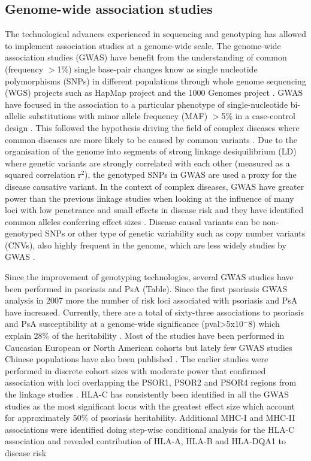\subsection{Genome-wide association studies}
The technological advances experienced in sequencing and genotyping has allowed to implement association studies at a genome-wide scale. The genome-wide association studies (GWAS) have benefit from the understanding of common (frequency ${>}$1\%) single base-pair changes know as single nucleotide polymorphisms (SNPs) in different populations through whole genome sequencing (WGS) projects such as HapMap \parencite{The international HapMaP Consortium} project and the 1000 Genomes project \parencite{The 1000 Genomes}. GWAS have focused in the association to a particular phenotype of single-nucleotide bi-allelic substitutions with minor allele frequency (MAF) ${>}$5\% in a case-control design \parencite{Ku2010}. This followed the hypothesis driving the field of complex diseases where common diseases are more likely to be caused by common variants \parencite{Schork2009}. Due to the organisation of the genome into segments of strong linkage desiquilibrium (LD) where genetic variants are strongly correlated with each other (measured as a squared correlation r$^2$), the genotyped SNPs in GWAS are used a proxy for the disease causative variant. In the context of complex diseases, GWAS have greater power than the previous linkage studies when looking at the influence of many loci with low penetrance and small effects in disease risk and they have identified common alleles conferring effect sizes \parencite{Cui2010}.
Disease causal variants can be non-genotyped SNPs or other type of genetic variability such as copy number variants (CNVs), also highly frequent in the genome, which are less widely studies by GWAS \parencite{Hirschhorn2005, Ku2010}. 

Since the improvement of genotyping technologies, several GWAS studies have been performed in psoriasis and PsA (Table). Since the first psoriasis GWAS analysis in 2007 more the number of risk loci associated with psoriasis and PsA have increased. Currently, there are a total of sixty-three associations to psoriasis and PsA susceptibility at a genome-wide significance (pval>5x10$^-8$) which explain 28\% of the heritability \parencite{Tsoi2017}. Most of the studies have been performed in Caucasian European or North American cohorts but lately few GWAS studies Chinese populations have also been published \parencite{Zhang2009, Sun2010, Yin2015}. The earlier studies were performed in discrete cohort sizes with moderate power that confirmed association with loci overlapping the PSOR1, PSOR2 and PSOR4 regions from the linkage studies \parencite{}. HLA-C has consistently been identified in all the GWAS studies as the most significant locus with the greatest effect size which account for approximately 50\% of psoriasis heritability. Additional MHC-I and MHC-II associations were identified doing step-wise conditional analysis for the HLA-C association and revealed contribution of HLA-A, HLA-B and HLA-DQA1 to disease risk \parencite{Okada2014}   

